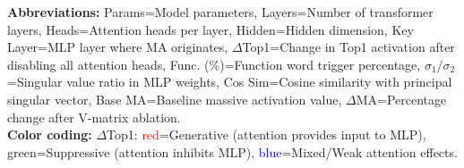 \documentclass[conference]{IEEEtran}
\begin{document}
\begin{table}[htbp]
\vspace{2mm}
\parbox{\linewidth}{\scriptsize
\textbf{Abbreviations:} Params=Model parameters, Layers=Number of transformer layers, Heads=Attention heads per layer, Hidden=Hidden dimension, Key Layer=MLP layer where MA originates, $\Delta$Top1=Change in Top1 activation after disabling all attention heads, Func. (\%)=Function word trigger percentage, $\sigma_1/\sigma_2$=Singular value ratio in MLP weights, Cos Sim=Cosine similarity with principal singular vector, Base MA=Baseline massive activation value, $\Delta$MA=Percentage change after V-matrix ablation. \\
\textbf{Color coding:} $\Delta$Top1: \textcolor{red}{red}=Generative (attention provides input to MLP), \textcolor{green!60!black}{green}=Suppressive (attention inhibits MLP), \textcolor{blue}{blue}=Mixed/Weak attention effects.}
\end{table}
\end{document}
